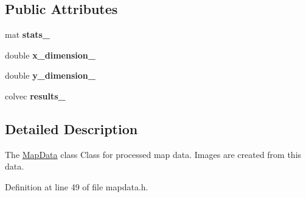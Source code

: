 \subsection*{Public Attributes}
\begin{DoxyCompactItemize}
\item 
\hypertarget{class_map_data_a25748ed400f0e0fff2cb3fd70074a8de}{mat {\bfseries stats\+\_\+}}\label{class_map_data_a25748ed400f0e0fff2cb3fd70074a8de}

\item 
\hypertarget{class_map_data_a605938fe04909b1147ed36b43a74292d}{double {\bfseries x\+\_\+dimension\+\_\+}}\label{class_map_data_a605938fe04909b1147ed36b43a74292d}

\item 
\hypertarget{class_map_data_ae730473a1d211f29a29727b03463edc0}{double {\bfseries y\+\_\+dimension\+\_\+}}\label{class_map_data_ae730473a1d211f29a29727b03463edc0}

\item 
\hypertarget{class_map_data_a395c613ef1240dea250d2fa7df5d4d47}{colvec {\bfseries results\+\_\+}}\label{class_map_data_a395c613ef1240dea250d2fa7df5d4d47}

\end{DoxyCompactItemize}


\subsection{Detailed Description}
The \hyperlink{class_map_data}{Map\+Data} class Class for processed map data. Images are created from this data. 

Definition at line 49 of file mapdata.\+h.



